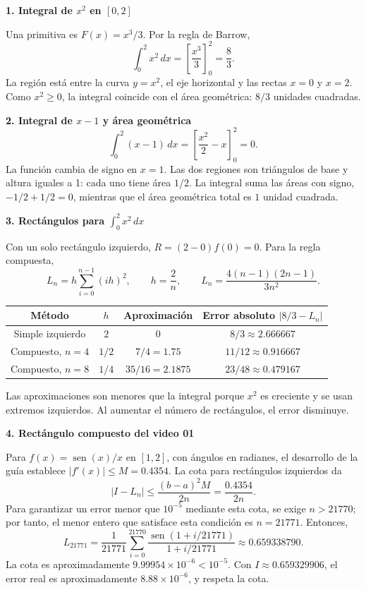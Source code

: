 \documentclass[10pt,letterpaper]{article}
\begin{document}
{\color{actividades}\textbf{1. Integral de $x^2$ en $[0,2]$}}

Una primitiva es $F(x)=x^3/3$. Por la regla de Barrow,
\[
\int_0^2 x^2\,dx=\left[\frac{x^3}{3}\right]_0^2=\boxed{\frac83}.
\]
La región está entre la curva $y=x^2$, el eje horizontal y las rectas $x=0$ y $x=2$. Como $x^2\geq0$, la integral coincide con el área geométrica: $8/3$ unidades cuadradas.

{\color{actividades}\textbf{2. Integral de $x-1$ y área geométrica}}
\[
\int_0^2(x-1)\,dx=\left[\frac{x^2}{2}-x\right]_0^2=\boxed{0}.
\]
La función cambia de signo en $x=1$. Las dos regiones son triángulos de base y altura iguales a 1: cada uno tiene área $1/2$. La integral suma las áreas con signo, $-1/2+1/2=0$, mientras que el área geométrica total es $\boxed{1}$ unidad cuadrada.

{\color{actividades}\textbf{3. Rectángulos para $\int_0^2 x^2\,dx$}}

Con un solo rectángulo izquierdo, $R=(2-0)f(0)=\boxed{0}$. Para la regla compuesta,
\[
L_n=h\sum_{i=0}^{n-1}(ih)^2,\qquad h=\frac2n,
\qquad L_n=\frac{4(n-1)(2n-1)}{3n^2}.
\]
\begin{center}
\begin{tabular}{c|c|c|c}
Método & $h$ & Aproximación & Error absoluto $|8/3-L_n|$\\ \hline
Simple izquierdo & $2$ & $0$ & $8/3\approx2.666667$\\
Compuesto, $n=4$ & $1/2$ & $7/4=1.75$ & $11/12\approx0.916667$\\
Compuesto, $n=8$ & $1/4$ & $35/16=2.1875$ & $23/48\approx0.479167$
\end{tabular}
\end{center}
Las aproximaciones son menores que la integral porque $x^2$ es creciente y se usan extremos izquierdos. Al aumentar el número de rectángulos, el error disminuye.

{\color{actividades}\textbf{4. Rectángulo compuesto del video 01}}

Para $f(x)=\operatorname{sen}(x)/x$ en $[1,2]$, con ángulos en radianes, el desarrollo de la guía establece $|f'(x)|\leq M=0.4354$. La cota para rectángulos izquierdos da
\[
|I-L_n|\leq\frac{(b-a)^2M}{2n}=\frac{0.4354}{2n}.
\]
Para garantizar un error menor que $10^{-5}$ mediante esta cota, se exige $n>21770$; por tanto, el menor entero que satisface esta condición es $\boxed{n=21771}$. Entonces,
\[
L_{21771}=\frac1{21771}\sum_{i=0}^{21770}
\frac{\operatorname{sen}(1+i/21771)}{1+i/21771}
\approx\boxed{0.659338790}.
\]
La cota es aproximadamente $9.99954\times10^{-6}<10^{-5}$. Con $I\approx0.659329906$, el error real es aproximadamente $8.88\times10^{-6}$, y respeta la cota.
\end{document}

